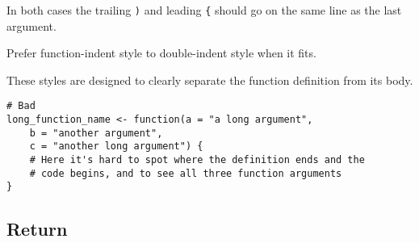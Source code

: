\documentclass[
]{book}
\begin{document}
In both cases the trailing \texttt{)} and leading \texttt{\{} should go on the same line as
the last argument.

Prefer function-indent style to double-indent style when it fits.

These styles are designed to clearly separate the function definition from its
body.

\begin{verbatim}
# Bad
long_function_name <- function(a = "a long argument",
    b = "another argument",
    c = "another long argument") {
    # Here it's hard to spot where the definition ends and the
    # code begins, and to see all three function arguments
}
\end{verbatim}

\hypertarget{return}{%
\subsection{Return}\label{return}}
\end{document}
